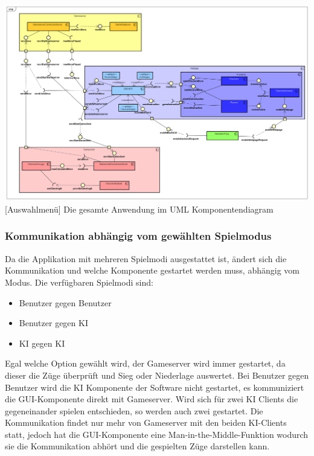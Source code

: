 \documentclass[12pt,a4paper,bibliography=totocnumbered,listof=totocnumbered]{article}
\begin{document}
\vspace{1em}
\begin{minipage}{\linewidth}
	\centering
	\includegraphics[width=1.0\linewidth]{pics/Komponentendiagram.png}
	[Auswahlmenü]{ Die gesamte Anwendung im UML Komponentendiagram}
	\label{fig:ComponentDiagram}
\end{minipage}



\subsubsection{Kommunikation abhängig vom gewählten Spielmodus}
\label{chap:Ablauf}
Da die Applikation mit mehreren Spielmodi ausgestattet ist, ändert sich die Kommunikation und welche Komponente gestartet werden muss, abhängig vom Modus.
Die verfügbaren Spielmodi sind:
\begin{itemize}
    \item Benutzer gegen Benutzer
    \item Benutzer gegen KI
    \item KI gegen KI
\end{itemize}
Egal welche Option gewählt wird, der Gameserver wird immer gestartet, da dieser die Züge überprüft und Sieg oder Niederlage auswertet.
Bei Benutzer gegen Benutzer wird die KI Komponente der Software nicht gestartet, es kommuniziert die GUI-Komponente direkt mit Gameserver.
Wird sich für zwei KI Clients die gegeneinander spielen entschieden, so werden auch zwei gestartet.
Die Kommunikation findet nur mehr von Gameserver mit den beiden KI-Clients statt, jedoch hat die GUI-Komponente eine Man-in-the-Middle-Funktion
wodurch sie die Kommunikation abhört und die gespielten Züge darstellen kann.
\end{document}
